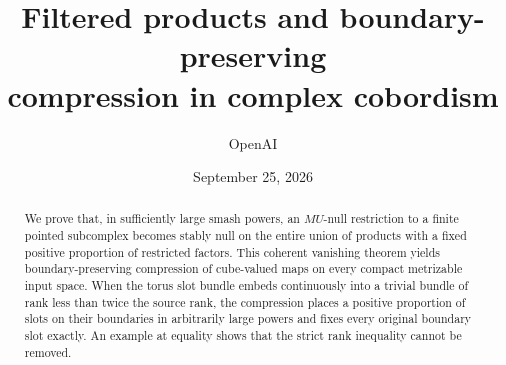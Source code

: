 \documentclass[11pt]{article}
\title{Filtered products and boundary-preserving\\compression in complex cobordism}
\author{OpenAI}
\date{September 25, 2026}
\theoremstyle{definition}
\theoremstyle{remark}
\numberwithin{equation}{section}
\begin{document}
\maketitle
\vspace{-24pt}
\begin{abstract}
We prove that, in sufficiently large smash powers, an $MU$-null restriction
to a finite pointed subcomplex becomes stably null on the entire union of
products with a fixed positive proportion of restricted factors. This
coherent vanishing theorem yields boundary-preserving compression of
cube-valued maps on every compact metrizable input space. When the torus
slot bundle embeds continuously into a trivial bundle of rank less than
twice the source rank, the compression places a positive proportion of
slots on their boundaries in arbitrarily large powers and fixes every
original boundary slot exactly. An example at equality shows that the
strict rank inequality cannot be removed.
\end{abstract}







\begingroup
\small


\endgroup
\end{document}
